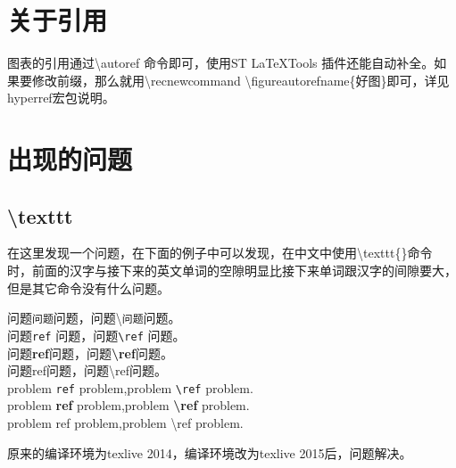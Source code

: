 \section{关于引用}
图表的引用通过{\ttfamily \textbackslash autoref} 命令即可，使用ST LaTeXTools 插件还能自动补全。如果要修改前缀，那么就用{\ttfamily \textbackslash recnewcommand \textbackslash figureautorefname\{好图\}}即可，详见hyperref宏包说明。

\section{出现的问题}
\subsection{\textbackslash texttt}
在这里发现一个问题，在下面的例子中可以发现，在中文中使用\textbackslash texttt\{\}命令时，前面的汉字与接下来的英文单词的空隙明显比接下来单词跟汉字的间隙要大，但是其它命令没有什么问题。

\begin{center}
\noindent 问题\texttt{问题}问题，问题\textbackslash\texttt{问题}问题。\\
问题\texttt{ref} 问题，问题\texttt{\textbackslash ref} 问题。\\
问题\textbf{ref}问题，问题\textbf{\textbackslash ref}问题。\\
问题\textsf{ref}问题，问题\textsf{\textbackslash ref}问题。\\
problem \texttt{ref} problem,problem \texttt{\textbackslash ref} problem.\\
problem \textbf{ref} problem,problem \textbf{\textbackslash ref} problem.\\
problem \textsf{ref} problem,problem \textsf{\textbackslash ref} problem.
\end{center}

原来的编译环境为texlive 2014，编译环境改为texlive 2015后，问题解决。
